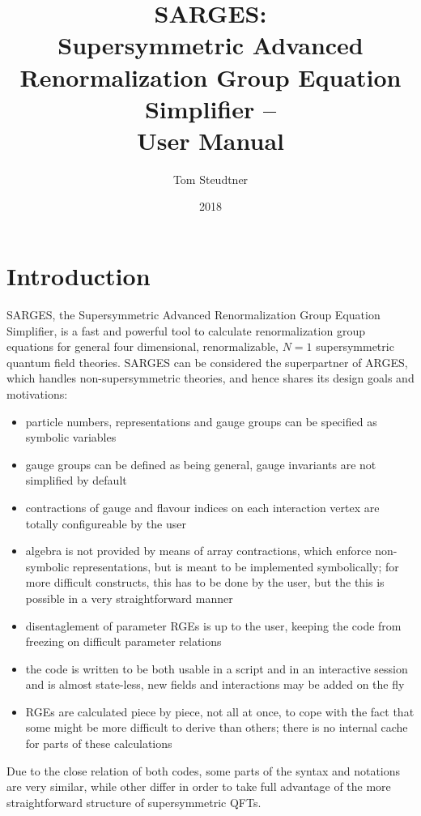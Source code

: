 \documentclass{scrartcl}
\title{SARGES: \\ Supersymmetric Advanced Renormalization Group Equation Simplifier -- \\ User Manual}
\date{2018}
\author{Tom Steudtner}
\begin{document}
\begin{titlepage}
\maketitle
\end{titlepage}
\newpage
\tableofcontents
\thispagestyle{empty}
\newpage
\section{Introduction}
SARGES, the Supersymmetric Advanced Renormalization Group Equation Simplifier, is a fast and powerful tool to calculate renormalization group equations for general four dimensional, renormalizable, $N=1$ supersymmetric quantum field theories. SARGES can be considered the superpartner of ARGES, which handles non-supersymmetric theories, and hence shares its design goals and motivations:
\begin{itemize}
\item particle numbers, representations and gauge groups can be specified as symbolic variables
\item gauge groups can be defined as being general, gauge invariants are not simplified by default
\item contractions of gauge and flavour indices on each interaction vertex are totally configureable by the user
\item algebra is not provided by means of array contractions, which enforce non-symbolic representations, but is meant to be implemented symbolically; for more difficult constructs, this has to be done by the user, but the this is possible in a very straightforward manner 
\item disentaglement of parameter RGEs is up to the user, keeping the code from freezing on difficult parameter relations
\item the code is written to be both usable in a script and in an interactive session and is almost state-less, new fields and interactions may be added on the fly
\item RGEs are calculated piece by piece, not all at once, to cope with the fact that some might be more difficult to derive than others; there is no internal cache for parts of these calculations
\end{itemize}
Due to the close relation of both codes, some parts of the syntax and notations are very similar, while other differ in order to take full advantage of the more straightforward structure of supersymmetric QFTs.
\end{document}
